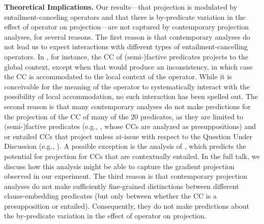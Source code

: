 \documentclass[12pt, a4paper]{article}
\begin{document}
\noindent
{\bf Theoretical Implications.}
	Our results---that projection is modulated by entailment-canceling operators and that there is by-predicate variation in the effect of operator on projection---are not captured by contemporary projection analyses, for several reasons.
	The first reason is that contemporary analyses do not lead us to expect interactions with different types of entailment-cancelling operators. In \citealt{heim_projection_1983}, for instance, the CC of (semi-)factive predicates projects to the global context, except when that would produce an inconsistency, in which case the CC is accommodated to the local context of the operator. While it is conceivable for the meaning of the operator to systematically interact with the possibility of local accommodation, no such interaction has been spelled out.
	The second reason is that many contemporary analyses do not make predictions for the projection of the CC of many of the 20 predicates, as they are limited to (semi-)factive predicates (e.g., \citealt{heim_projection_1983,van_der_sandt_presupposition_1992}, whose CCs are analyzed as presuppositions) and or entailed CCs that project unless at-issue with respect to the Question Under Discussion (e.g., \citealt{abrusan_predicting_2011,simons_best_2017}). A possible exception is the analysis of \citealt{schlenker_triggering_2021}, which predicts the potential for projection for CCs that are contextually entailed. In the full talk, we discuss how this analysis might be able to capture the gradient projection observed in our experiment.
	The third reason is that contemporary projection analyses do not make sufficiently fine-grained distinctions between different clause-embedding predicates (but only between whether the CC is a presupposition or entailed). Consequently, they do not make predictions about the by-predicate variation in the effect of operator on projection.


\end{document}
